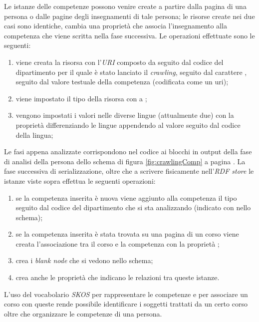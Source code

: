 \documentclass[tesi.tex]{subfiles}
\begin{document}
Le istanze delle competenze possono venire create a partire dalla
pagina di una persona o dalle pagine degli insegnamenti di tale
persona; le risorse create nei due casi sono identiche, cambia una
propriet\`a che associa l'insegnamento alla competenza che viene
scritta nella fase successiva. Le operazioni
effettuate sono le seguenti:
\begin{enumerate}
\item viene creata la risorsa con l'\emph{URI} composto da
   seguito dal codice del dipartimento
  per il quale \`e stato lanciato il \emph{crawling}, seguito dal
  carattere \xml{\#}, seguito dal valore testuale della competenza
  (codificata come un uri);
\item viene impostato il tipo della risorsa con  a
  ;
\item vengono impostati i valori nelle diverse lingue (attualmente
  due) con la propriet\`a  differenziando le
  lingue appendendo al valore  seguito dal codice della lingua;
\end{enumerate}

Le fasi appena analizzate corrispondono nel codice ai blocchi in
output della fase di analisi della persona dello schema di figura
\ref{fig:crawlingComp} a pagina \pageref{fig:crawlingComp}. La fase
successiva di serializzazione, oltre che a scrivere fisicamente
nell'\emph{RDF store} le istanze viste sopra effettua le seguenti
operazioni:
\begin{enumerate}
\item se la competenza inserita \`e nuova viene aggiunto alla
  competenza il tipo  seguito dal codice del
  dipartimento che si sta analizzando (indicato con  nello
  schema);
\item se la competenza inserita \`e stata trovata su una pagina di un
  corso viene creata l'associazione tra il corso e la competenza con
  la propriet\`a ;
\item crea i \emph{blank node}
  che si vedono nello schema;
\item crea anche le propriet\`a che indicano le
  relazioni tra queste istanze.
\end{enumerate}
L'uso del vocabolario \emph{SKOS} per rappresentare le competenze e
per associare un corso con queste rende possibile identificare i
soggetti trattati da un certo corso oltre che organizzare le
competenze di una persona.
\end{document}
